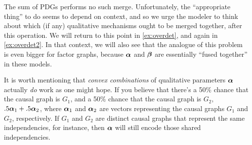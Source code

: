 %
The sum of PDGs performs no such merge.
%
%
Unfortunately, the ``appropriate thing'' to do seems to depend on context, and so we urge the modeler to think about which (if any) qualitative mechanisms ought to be merged together, after this operation. 
We will return to this point in \cref{ex:overdet},
    and again in \cref{ex:overdet2}.
In that context, we will also see that the
	analogue of this problem is even bigger 
    for factor graphs, because 
    $\boldsymbol\alpha$ and $\boldsymbol\beta$ are essentially ``fused together'' in these models.

It is worth mentioning that \emph{convex combinations} of qualitative parameters $\boldsymbol\alpha$ actually \emph{do} work as one might hope. 
If you believe that there's a 50\% chance that the causal graph is $G_1$, and a 50\% chance that the causal graph is $G_2$,  
%
$.5 \boldsymbol\alpha_1 + .5 \boldsymbol\alpha_2$, where $\boldsymbol\alpha_1$ and $\boldsymbol\alpha_2$ are vectors representing the causal graphs $G_1$ and $G_2$, respectively. 
If $G_1$ and $G_2$ are distinct causal graphs that represent the same independencies, for instance, then $\boldsymbol\alpha$ will still encode those shared independencies. 

